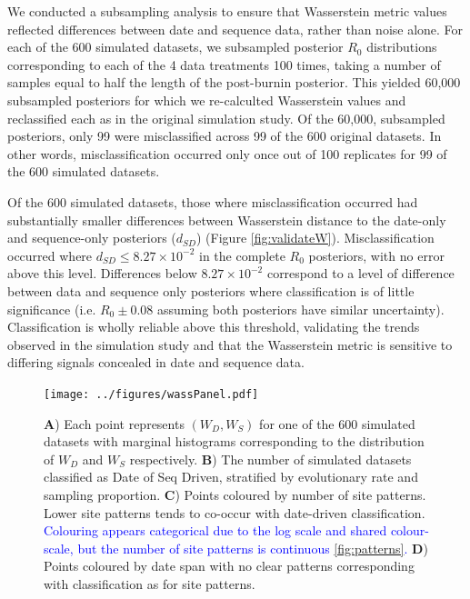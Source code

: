 \documentclass{article}
\begin{document}

We conducted a subsampling analysis to ensure that Wasserstein metric values reflected differences between date and sequence data, rather than noise alone. For each of the 600 simulated datasets, we subsampled posterior $R_{0}$ distributions corresponding to each of the 4 data treatments 100 times, taking a number of samples equal to half the length of the post-burnin posterior. This yielded 60,000 subsampled posteriors for which we re-calculted Wasserstein values and reclassified each as in the original simulation study. Of the 60,000, subsampled posteriors, only 99 were misclassified across 99 of the 600 original datasets. In other words, misclassification occurred only once out of 100 replicates for 99 of the 600 simulated datasets.

Of the 600 simulated datasets, those where misclassification occurred had substantially smaller differences between Wasserstein distance to the date-only and sequence-only posteriors ($d_{SD}$) (Figure \ref{fig:validateW}). Misclassification occurred where $d_{SD} \le 8.27\times10^{-2}$ in the complete $R_0$ posteriors, with no error above this level. Differences below $8.27\times10^{-2}$ correspond to a level of difference between data and sequence only posteriors where classification is of little significance (i.e. $R_0 \pm 0.08$ assuming both posteriors have similar uncertainty). Classification is wholly reliable above this threshold, validating the trends observed in the simulation study and that the Wasserstein metric is sensitive to differing signals concealed in date and sequence data.

\begin{figure}[H]
\centering
\texttt{[image: ../figures/wassPanel.pdf]}
\caption{\textbf{A}) Each point represents $(W_D, W_S)$ for one of the 600 simulated datasets with marginal histograms corresponding to the distribution of $W_D$ and $W_S$ respectively. \textbf{B}) The number of simulated datasets classified as Date of Seq Driven, stratified by evolutionary rate and sampling proportion. \textbf{C}) Points coloured by number of site patterns. Lower site patterns tends to co-occur with date-driven classification. \textcolor{blue}{Colouring appears categorical due to the log scale and shared colour-scale, but the number of site patterns is continuous \ref{fig:patterns}.} \textbf{D}) Points coloured by date span with no clear patterns corresponding with classification as for site patterns. }
\label{fig:wData}
\end{figure}
\end{document}
